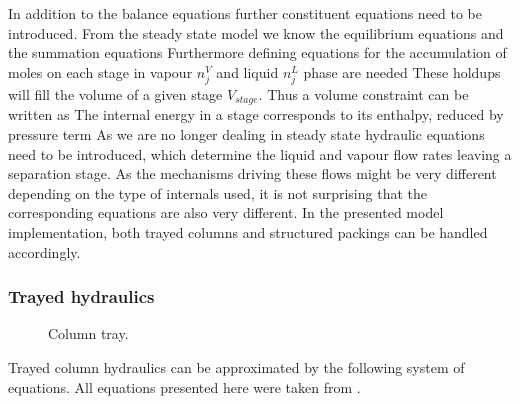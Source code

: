     In addition to the balance equations further constituent equations need to be introduced. From the
    steady state model we know the equilibrium equations
    and the summation equations
    Furthermore defining equations for the accumulation of moles on each stage in vapour $n_j^V$ and
    liquid $n_j^L$ phase are needed
    These holdups will fill the volume of a given stage $V_{stage}$. Thus a volume constraint
    can be written as
    The internal energy in a stage corresponds to its enthalpy, reduced by pressure term
    As we are no longer dealing in steady state hydraulic equations need to be introduced,
    which determine the liquid and vapour flow rates leaving a separation stage. As the
    mechanisms driving these flows might be very different depending on the type of internals
    used, it is not surprising that the corresponding equations are also very different. In the
    presented model implementation, both trayed columns and structured packings can be handled accordingly.

        \subsubsection{Trayed hydraulics}
        \label{sec:mathpro:dynamic:trayhyd}
        \begin{figure}
            \center
            
            \caption{Column tray.}
            \label{fig:col_tray}
        \end{figure}

        Trayed column hydraulics can be approximated by the following system of equations.
        All equations presented here were taken from \cite{Lockett.2009}.

